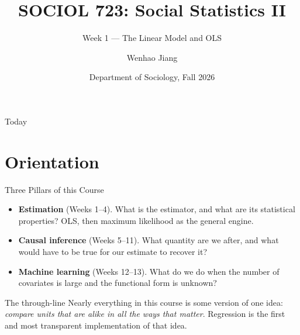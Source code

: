 \documentclass[aspectratio=169,11pt,xcolor=dvipsnames]{beamer}
\title[SOCIOL 723]{SOCIOL 723: Social Statistics II\\[2pt]}
\subtitle{\large Week 1 --- The Linear Model and OLS\\[-8pt]}
\author[Jiang]{\large Wenhao Jiang\vspace{-1.5em}}
\institute[Duke]{}
\date{\large Department of Sociology, Fall 2026}
\begin{document}
\begin{frame}[plain]
  \titlepage
\end{frame}

\begin{frame}{Today}
  \tableofcontents
\end{frame}

\section[Orientation]{Orientation}
\begin{frame}\sectionpage\end{frame}

\begin{frame}{Three Pillars of this Course}
\begin{itemize}\itemsep6pt
  \item \textbf{Estimation} (Weeks 1--4). What is the estimator, and what are its
        statistical properties? OLS, then maximum likelihood as the general engine.
  \item \textbf{Causal inference} (Weeks 5--11). What quantity are we after, and
        what would have to be true for our estimate to recover it?
  \item \textbf{Machine learning} (Weeks 12--13). What do we do when the number of
        covariates is large and the functional form is unknown?
\end{itemize}
\vskip8pt
\begin{block}{The through-line}
Nearly everything in this course is some version of one idea:
\emph{compare units that are alike in all the ways that matter}. Regression is the
first and most transparent implementation of that idea.
\end{block}
\end{frame}
\end{document}
